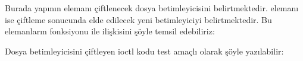 \documentclass[a4paper,10pt,turkish]{sphinxmanual}
\begin{document}
\begin{sphinxVerbatim}[commandchars=\\\{\}]
\end{sphinxVerbatim}

\sphinxAtStartPar
Burada yapının  elemanı çiftlenecek dosya betimleyicisini belirtmektedir. 
elemanı ise çiftleme sonucunda elde edilecek yeni betimleyiciyi belirtmektedir. Bu elemanların
 fonksiyonu ile ilişkisini şöyle temsil edebiliriz:

\begin{sphinxVerbatim}[commandchars=\\\{\}]
\end{sphinxVerbatim}

\sphinxAtStartPar
Dosya betimleyicisini çiftleyen ioctl kodu test amaçlı olarak şöyle yazılabilir:
\end{document}
